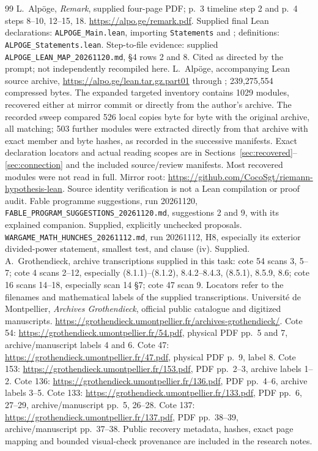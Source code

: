 \documentclass[11pt,a4paper]{article}
\theoremstyle{definition}\newtheorem{remark}[theorem]{Remark}
\begin{document}
\begin{thebibliography}{99}
 L.~Alp\"oge, \emph{Remark}, supplied four-page PDF; p.~3 timeline step 2 and p.~4 steps 8--10, 12--15, 18. \url{https://alpo.ge/remark.pdf}. Supplied final Lean declarations: \texttt{ALPOGE\_Main.lean}, importing \texttt{Statements} and ; definitions: \texttt{ALPOGE\_Statements.lean}. Step-to-file evidence: supplied \texttt{ALPOGE\_LEAN\_MAP\_20261120.md}, \S4 rows 2 and 8. Cited as directed by the prompt; not independently recompiled here.
 L.~Alp\"oge, accompanying Lean source archive, \url{https://alpo.ge/lean.tar.gz.part01} through ; 239,275,554 compressed bytes. The expanded targeted inventory contains 1029 modules, recovered either at mirror commit  or directly from the author's archive. The recorded sweep compared 526 local copies byte for byte with the original archive, all matching; 503 further modules were extracted directly from that archive with exact member and byte hashes, as recorded in the successive manifests. Exact declaration locators and actual reading scopes are in Sections~\ref{sec:recovered}--\ref{sec:connection} and the included source/review manifests. Most recovered modules were not read in full. Mirror root: \url{https://github.com/CocoSgt/riemann-hypothesis-lean}. Source identity verification is not a Lean compilation or proof audit.
 Fable programme suggestions, run 20261120, \texttt{FABLE\_PROGRAM\_SUGGESTIONS\_20261120.md}, suggestions 2 and 9, with its explained companion. Supplied, explicitly unchecked proposals.
 \texttt{WARGAME\_MATH\_HUNCHES\_20261112.md}, run 20261112, H8, especially its exterior divided-power statement, smallest test, and clause (iv). Supplied.
 A.~Grothendieck, archive transcriptions supplied in this task: cote 54 scans 3, 5--7; cote 4 scans 2--12, especially (8.1.1)--(8.1.2), 8.4.2--8.4.3, (8.5.1), 8.5.9, 8.6; cote 16 scans 14--18, especially scan 14 \S7; cote 47 scan 9. Locators refer to the filenames and mathematical labels of the supplied transcriptions.
 Universit\'e de Montpellier, \emph{Archives Grothendieck}, official public catalogue and digitized manuscripts. \url{https://grothendieck.umontpellier.fr/archives-grothendieck/}. Cote 54: \url{https://grothendieck.umontpellier.fr/54.pdf}, physical PDF pp.~5 and 7, archive/manuscript labels 4 and 6. Cote 47: \url{https://grothendieck.umontpellier.fr/47.pdf}, physical PDF p.~9, label 8. Cote 153: \url{https://grothendieck.umontpellier.fr/153.pdf}, PDF pp.~2--3, archive labels 1--2. Cote 136: \url{https://grothendieck.umontpellier.fr/136.pdf}, PDF pp.~4--6, archive labels 3--5. Cote 133: \url{https://grothendieck.umontpellier.fr/133.pdf}, PDF pp.~6, 27--29, archive/manuscript pp.~5, 26--28. Cote 137: \url{https://grothendieck.umontpellier.fr/137.pdf}, PDF pp.~38--39, archive/manuscript pp.~37--38. Public recovery metadata, hashes, exact page mapping and bounded visual-check provenance are included in the research notes.

\end{thebibliography}
\end{document}
